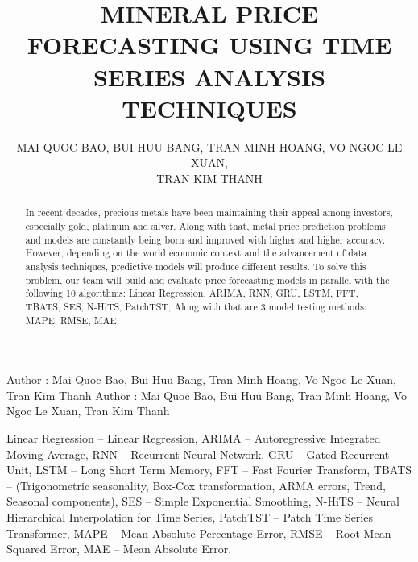 \documentclass{ieeeojies}
\begin{document}
\title{MINERAL PRICE FORECASTING USING TIME SERIES ANALYSIS TECHNIQUES}

\author{\uppercase{Mai Quoc Bao},
\uppercase{Bui Huu Bang, Tran Minh Hoang, Vo Ngoc Le Xuan,\\ Tran Kim Thanh}}

\address[1]{Faculty of Information Systems, University of Information Technology, (e-mail: 21521850@gm.uit.edu.vn)}
\address[2]{Faculty of Information Systems, University of Information Technology, (e-mail: 21520151@gm.uit.edu.vn)}
\address[3]{Faculty of Information Systems, University of Information Technology, (e-mail: 21522101@gm.uit.edu.vn)}
\address[4]{Faculty of Information Systems, University of Information Technology, (e-mail: 21521692@gm.uit.edu.vn)}
\address[5]{Faculty of Information Systems, University of Information Technology, (e-mail: 21522605@gm.uit.edu.vn)}

\markboth
{Author \headeretal: Mai Quoc Bao, Bui Huu Bang, Tran Minh Hoang, Vo Ngoc Le Xuan, Tran Kim Thanh}
{Author \headeretal: Mai Quoc Bao, Bui Huu Bang, Tran Minh Hoang, Vo Ngoc Le Xuan, Tran Kim Thanh}

\begin{abstract}
In recent decades, precious metals have been maintaining their appeal among investors, especially gold, platinum and silver. Along with that, metal price prediction problems and models are constantly being born and improved with higher and higher accuracy. However, depending on the world economic context and the advancement of data analysis techniques, predictive models will produce different results. To solve this problem, our team will build and evaluate price forecasting models in parallel with the following 10 algorithms: Linear Regression, ARIMA, RNN, GRU, LSTM, FFT, TBATS, SES, N-HiTS, PatchTST; Along with that are 3 model testing methods: MAPE, RMSE, MAE.
\end{abstract}

\begin{keywords}
Linear Regression – Linear Regression, ARIMA – Autoregressive Integrated Moving Average, RNN – Recurrent Neural Network, GRU – Gated Recurrent Unit, LSTM – Long Short Term Memory, FFT – Fast Fourier Transform, TBATS – (Trigonometric seasonality, Box-Cox transformation, ARMA errors, Trend, Seasonal components), SES – Simple Exponential Smoothing, N-HiTS – Neural Hierarchical Interpolation for Time Series, PatchTST – Patch Time Series Transformer, MAPE – Mean Absolute Percentage Error,  RMSE – Root Mean Squared Error, MAE – Mean Absolute Error.
\end{keywords}
\end{document}
